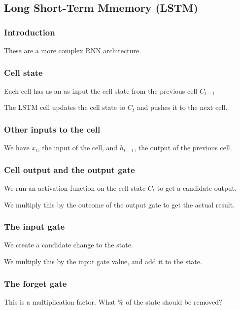 
\subsection{Long Short-Term Mmemory (LSTM)}

\subsubsection{Introduction}

These are a more complex RNN architecture.

\subsubsection{Cell state}

Each cell has as an as input the cell state from the previous cell \(C_{t-1}\)

The LSTM cell updates the cell state to \(C_{t}\) and pushes it to the next cell.

\subsubsection{Other inputs to the cell}

We have \(x_t\), the input of the cell, and \(h_{t-1}\), the output of the previous cell.

\subsubsection{Cell output and the output gate}

We run an activation function on the cell state \(C_t\) to get a candidate output.

We multiply this by the outcome of the output gate to get the actual result.

\subsubsection{The input gate}

We create a candidate change to the state.

We multiply this by the input gate value, and add it to the state.

\subsubsection{The forget gate}

This is a multiplication factor. What \% of the state should be removed?

